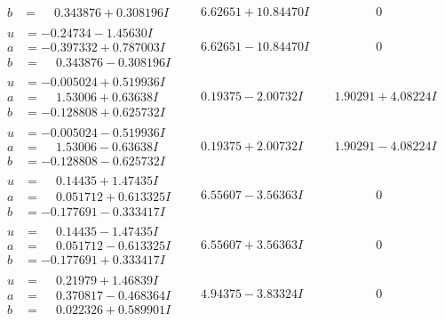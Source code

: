 \documentclass[1p]{elsarticle_modified}
\theoremstyle{definition}
\begin{document}
$$\begin{array}{c|c|c}
\begin{aligned}
b &= \phantom{-}0.343876 + 0.308196 I\end{aligned}
 & \phantom{-}6.62651 + 10.84470 I & \phantom{-0.000000 } 0 \\ \hline\begin{aligned}
u &= -0.24734 - 1.45630 I \\
a &= -0.397332 + 0.787003 I \\
b &= \phantom{-}0.343876 - 0.308196 I\end{aligned}
 & \phantom{-}6.62651 - 10.84470 I & \phantom{-0.000000 } 0 \\ \hline\begin{aligned}
u &= -0.005024 + 0.519936 I \\
a &= \phantom{-}1.53006 + 0.63638 I \\
b &= -0.128808 + 0.625732 I\end{aligned}
 & \phantom{-}0.19375 - 2.00732 I & \phantom{-}1.90291 + 4.08224 I \\ \hline\begin{aligned}
u &= -0.005024 - 0.519936 I \\
a &= \phantom{-}1.53006 - 0.63638 I \\
b &= -0.128808 - 0.625732 I\end{aligned}
 & \phantom{-}0.19375 + 2.00732 I & \phantom{-}1.90291 - 4.08224 I \\ \hline\begin{aligned}
u &= \phantom{-}0.14435 + 1.47435 I \\
a &= \phantom{-}0.051712 + 0.613325 I \\
b &= -0.177691 - 0.333417 I\end{aligned}
 & \phantom{-}6.55607 - 3.56363 I & \phantom{-0.000000 } 0 \\ \hline\begin{aligned}
u &= \phantom{-}0.14435 - 1.47435 I \\
a &= \phantom{-}0.051712 - 0.613325 I \\
b &= -0.177691 + 0.333417 I\end{aligned}
 & \phantom{-}6.55607 + 3.56363 I & \phantom{-0.000000 } 0 \\ \hline\begin{aligned}
u &= \phantom{-}0.21979 + 1.46839 I \\
a &= \phantom{-}0.370817 - 0.468364 I \\
b &= \phantom{-}0.022326 + 0.589901 I\end{aligned}
 & \phantom{-}4.94375 - 3.83324 I & \phantom{-0.000000 } 0 \\ \hline\begin{aligned}

\end{aligned}
\end{array}$$
\end{document}
